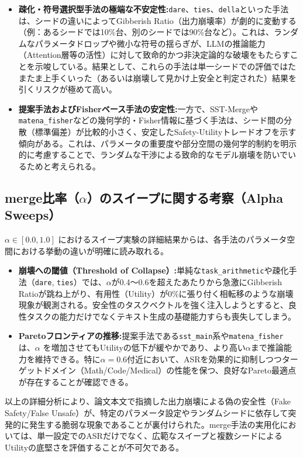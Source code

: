\documentclass{article}
\begin{document}
\begin{itemize}
    \item \textbf{疎化・符号選択型手法の極端な不安定性:}\texttt{dare}、\texttt{ties}、\texttt{della}といった手法は、シードの違いによってGibberish Ratio（出力崩壊率）が劇的に変動する（例：あるシードでは10\%台、別のシードでは90\%台など）。これは、ランダムなパラメータドロップや微小な符号の揺らぎが、LLMの推論能力（Attention層等の活性）に対して致命的かつ非決定論的な破壊をもたらすことを示唆している。結果として、これらの手法は単一シードでの評価ではたまたま上手くいった（あるいは崩壊して見かけ上安全と判定された）結果を引くリスクが極めて高い。
    \item \textbf{提案手法およびFisherベース手法の安定性:}一方で、SST-Mergeや\texttt{matena\_fisher}などの幾何学的・Fisher情報に基づく手法は、シード間の分散（標準偏差）が比較的小さく、安定したSafety-Utilityトレードオフを示す傾向がある。これは、パラメータの重要度や部分空間の幾何学的制約を明示的に考慮することで、ランダムな干渉による致命的なモデル崩壊を防いでいるためと考えられる。
\end{itemize}

\subsection{merge比率（$\alpha$）のスイープに関する考察（Alpha Sweeps）}
$\alpha \in [0.0, 1.0]$ におけるスイープ実験の詳細結果からは、各手法のパラメータ空間における挙動の違いが明確に読み取れる。

\begin{itemize}
    \item \textbf{崩壊への閾値（Threshold of Collapse）:}単純な\texttt{task\_arithmetic}や疎化手法（\texttt{dare}, \texttt{ties}）では、$\alpha$が0.4〜0.6を超えたあたりから急激にGibberish Ratioが跳ね上がり、有用性（Utility）が0\%に張り付く相転移のような崩壊現象が観測される。安全性のタスクベクトルを強く注入しようとすると、良性タスクの能力だけでなくテキスト生成の基礎能力すらも喪失してしまう。
    \item \textbf{Paretoフロンティアの推移:}提案手法である\texttt{sst\_main}系や\texttt{matena\_fisher}は、$\alpha$ を増加させてもUtilityの低下が緩やかであり、より高い$\alpha$まで推論能力を維持できる。特に$\alpha=0.6$付近において、ASRを効果的に抑制しつつターゲットドメイン（Math/Code/Medical）の性能を保つ、良好なPareto最適点が存在することが確認できる。
\end{itemize}

以上の詳細分析により、論文本文で指摘した出力崩壊による偽の安全性（Fake Safety/False Unsafe）が、特定のパラメータ設定やランダムシードに依存して突発的に発生する脆弱な現象であることが裏付けられた。merge手法の実用化においては、単一設定でのASRだけでなく、広範なスイープと複数シードによるUtilityの底堅さを評価することが不可欠である。
\end{document}
